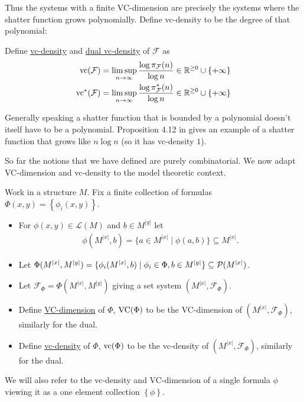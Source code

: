 \documentclass{amsart}
\newcommand{\F}{\mathcal F}
\renewcommand{\LL}{\mathcal L}
\newcommand{\curly}[1]{\left\{#1\right\}}
\newcommand{\defn}{\underline}
\begin{document}
Thus the systems with a finite VC-dimension are precisely the systems where the shatter function grows polynomially.
Define vc-density to be the degree of that polynomial:
\begin{Definition}
  Define \defn{vc-density} and \defn{dual vc-density} of $\F$ as
  \begin{align*}
    \vc(\F) &= \limsup_{n \to \infty}\frac{\log \pi_\F(n)}{\log n} \in \R^{\geq 0} \cup \curly{+\infty}\\
    \vc^*(\F) &= \limsup_{n \to \infty}\frac{\log \pi^*_\F(n)}{\log n}\in \R^{\geq 0} \cup \curly{+\infty}
  \end{align*}
\end{Definition}

Generally speaking a shatter function that is bounded by a polynomial doesn't itself have to be a polynomial.
Proposition 4.12 in \cite{vc_density} gives an example of a shatter function that grows like $n \log n$ (so it has vc-density $1$).

So far the notions that we have defined are purely combinatorial.
We now adapt VC-dimension and vc-density to the model theoretic context.

\begin{Definition}
  Work in a structure $M$.
  Fix a finite collection of formulas $\Phi(x, y) = \curly{\phi_i(x, y)}$.

  \begin{itemize}
  \item For $\phi(x, y) \in \LL(M)$ and $b \in M^{|y|}$ let 
  \begin{align*}
	  \phi(M^{|x|}, b) = \{a \in M^{|x|} \mid \phi(a, b)\} \subseteq M^{|x|}.
  \end{align*}
  \item Let $\Phi(M^{|x|}, M^{|y|})= \{\phi_i(M^{|x|}, b) \mid \phi_i \in \Phi, b \in M^{|y|}\} \subseteq \mathcal P(M^{|x|})$.
  \item Let $\F_\Phi = \Phi(M^{|x|}, M^{|y|})$ giving a set system $(M^{|x|}, \F_\Phi)$.
  \item Define \defn{VC-dimension} of $\Phi$, $\operatorname{VC}(\Phi)$ to be the VC-dimension of $(M^{|x|}, \F_\Phi)$, similarly for the dual.
  \item Define \defn{vc-density} of $\Phi$, $\operatorname{vc}(\Phi)$ to be the vc-density of $(M^{|x|}, \F_\Phi)$, similarly for the dual.
  \end{itemize}

  We will also refer to the vc-density and VC-dimension of a single formula $\phi$
  viewing it as a one element collection $\curly{\phi}$.
\end{Definition}
\end{document}
